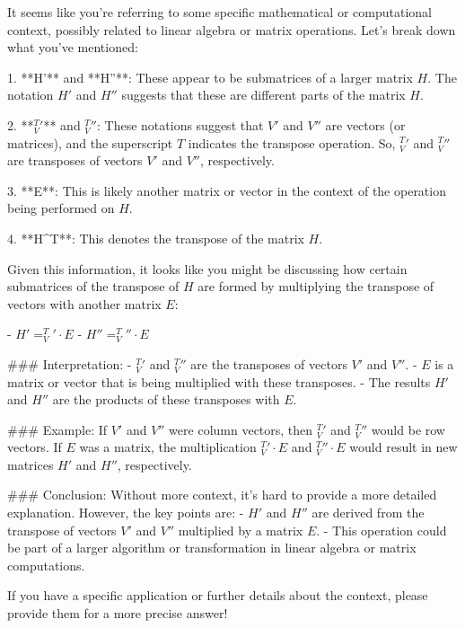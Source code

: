 It seems like you're referring to some specific mathematical or computational context, possibly related to linear algebra or matrix operations. Let's break down what you've mentioned:

1. **H'** and **H''**: These appear to be submatrices of a larger matrix \( H \). The notation \( H' \) and \( H'' \) suggests that these are different parts of the matrix \( H \).

2. **\( ^T_V' \)** and \( ^T_V'' \): These notations suggest that \( V' \) and \( V'' \) are vectors (or matrices), and the superscript \( T \) indicates the transpose operation. So, \( ^T_V' \) and \( ^T_V'' \) are transposes of vectors \( V' \) and \( V'' \), respectively.

3. **E**: This is likely another matrix or vector in the context of the operation being performed on \( H \).

4. **H^T**: This denotes the transpose of the matrix \( H \).

Given this information, it looks like you might be discussing how certain submatrices of the transpose of \( H \) are formed by multiplying the transpose of vectors with another matrix \( E \):

- \( H' = ^T_V' \cdot E \)
- \( H'' = ^T_V'' \cdot E \)

### Interpretation:
- \( ^T_V' \) and \( ^T_V'' \) are the transposes of vectors \( V' \) and \( V'' \).
- \( E \) is a matrix or vector that is being multiplied with these transposes.
- The results \( H' \) and \( H'' \) are the products of these transposes with \( E \).

### Example:
If \( V' \) and \( V'' \) were column vectors, then \( ^T_V' \) and \( ^T_V'' \) would be row vectors. If \( E \) was a matrix, the multiplication \( ^T_V' \cdot E \) and \( ^T_V'' \cdot E \) would result in new matrices \( H' \) and \( H'' \), respectively.

### Conclusion:
Without more context, it's hard to provide a more detailed explanation. However, the key points are:
- \( H' \) and \( H'' \) are derived from the transpose of vectors \( V' \) and \( V'' \) multiplied by a matrix \( E \).
- This operation could be part of a larger algorithm or transformation in linear algebra or matrix computations.

If you have a specific application or further details about the context, please provide them for a more precise answer!